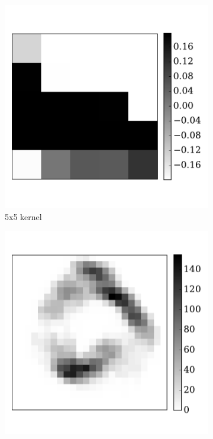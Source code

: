 \documentclass[runningheads,a4paper]{llncs}
\begin{document}
\begin{figure}[tbh!]
\begin{subfigure}[t]{0.3\textwidth}
		\includegraphics[width=\textwidth]{6-3.pdf}
		\caption{5x5 kernel}
		\label{Fig:63}
	\end{subfigure}
	\begin{subfigure}[t]{0.3\textwidth}
		\includegraphics[width=\textwidth]{6-4.pdf}

\end{subfigure}
\end{figure}
\end{document}
